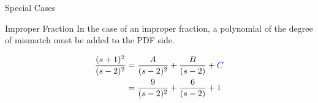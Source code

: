 \documentclass{../templates/topic}
\begin{document}
\begin{section}{Special Cases}
\begin{subsection}{Improper Fraction}
		In the case of an improper fraction, a polynomial of the degree of mismatch must be added to the PDF side.
		
		\begin{align*}
			\frac{(s+1)^2}{(s-2)^2} &= \frac{A}{(s-2)^2}+\frac{B}{(s-2)}+\textcolor{blue}{C} \\
			&= \frac{9}{(s-2)^2}+\frac{6}{(s-2)}+\textcolor{blue}{1}
		\end{align*}
		
		
	\end{subsection}
\end{section}
	
\end{document}
